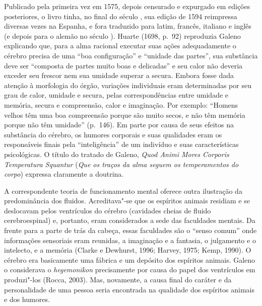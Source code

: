 Publicado pela primeira vez em 1575, depois censurado e expurgado em
edições posteriores, o livro tinha, no final do século , sua edição
de 1594 reimpressa diversas vezes na Espanha, e fora traduzido para
latim, francês, italiano e inglês (e depois para o alemão no século
). Huarte (1698, p.~92) reproduzia Galeno explicando que, para a
alma racional executar suas ações adequadamente o cérebro precisa de uma
``boa configuração'' e ``unidade das partes'', sua substância deve ser
``composta de partes muito boas e delicadas'' e seu calor não deveria
exceder seu frescor nem sua umidade superar a secura. Embora fosse dada
atenção à morfologia do órgão, variações individuais eram determinadas
por seu grau de calor, umidade e secura, pelas correspondências entre
umidade e memória, secura e compreensão, calor e imaginação. Por
exemplo: ``Homens velhos têm uma boa compreensão porque são muito secos,
e não têm memória porque não têm umidade'' (p.~146). Em parte por causa
de seus efeitos na substância do cérebro, os humores corporais e suas
qualidades eram os responsáveis finais pela ``inteligência'' de um
indivíduo e suas características psicológicas. O título do tratado de
Galeno, \emph{Quod Animi Mores Corporis Temperatura Squantur} (\emph{Que
os traços da alma seguem os temperamentos do corpo}) expressa claramente
a doutrina.

A correspondente teoria de funcionamento mental oferece outra ilustração
da predominância dos fluidos. Acreditava"-se que os espíritos animais
residiam e se deslocavam pelos ventrículos do cérebro (cavidades cheias
de fluido cerebroespinal) e, portanto, eram considerados a sede das
faculdades mentais. Da frente para a parte de trás da cabeça, essas
faculdades são o ``senso comum'' onde informações sensoriais eram
reunidas, a imaginação e a fantasia, o julgamento e o intelecto, e a
memória (Clarke e Dewhurst, 1996; Harvey, 1975; Kemp, 1990). O cérebro
era basicamente uma fábrica e um depósito dos espíritos animais. Galeno
o considerava o \emph{hegemonikon} precisamente por causa do papel dos
ventrículos em produzi"-los (Rocca, 2003). Mas, novamente, a causa final
do caráter e da personalidade de uma pessoa seria encontrada na
qualidade dos espíritos animais e dos humores.


